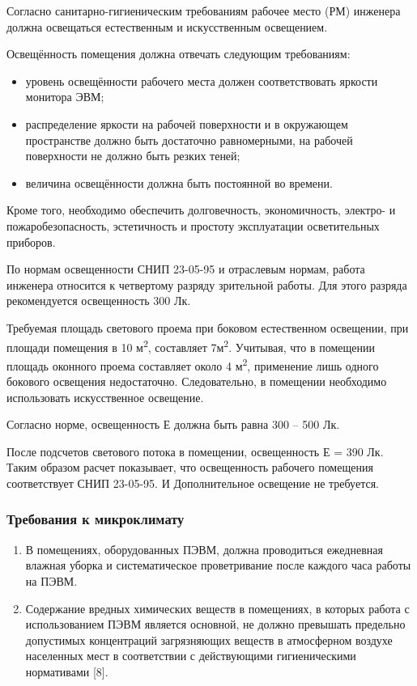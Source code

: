 Согласно санитарно-гигиеническим требованиям рабочее место (РМ) инженера должна освещаться естественным и искусственным освещением.

Освещённость помещения должна отвечать следующим требованиям:

\begin{itemize}
 \item уровень освещённости рабочего места должен соответствовать яркости монитора ЭВМ;
 \item распределение яркости на рабочей поверхности и в окружающем пространстве должно быть достаточно равномерными, на рабочей поверхности не должно быть резких теней;
 \item величина освещённости должна быть постоянной во времени.
\end{itemize}

Кроме того, необходимо обеспечить долговечность, экономичность, электро- и пожаробезопасность, эстетичность и простоту эксплуатации осветительных приборов.

По нормам освещенности СНИП 23-05-95 и отраслевым нормам, работа инженера относится к четвертому разряду зрительной работы. Для этого разряда рекомендуется освещенность 300 Лк. 

Требуемая площадь светового проема при боковом естественном освещении, при площади помещения в 10 м\textsuperscript{2}, составляет 7м\textsuperscript{2}. Учитывая, что в помещении площадь оконного проема составляет около 4 м\textsuperscript{2}, применение лишь одного бокового освещения недостаточно. Следовательно, в помещении необходимо использовать искусственное освещение. 

Согласно норме, освещенность Е должна быть равна 300 – 500 Лк. 

После подсчетов светового потока в помещении, освещенность Е = 390 Лк. Таким образом расчет показывает, что освещенность рабочего помещения соответствует СНИП 23-05-95. И Дополнительное освещение не требуется.

\subsubsection{Требования к микроклимату}

\begin{enumerate}
 \item В помещениях, оборудованных ПЭВМ, должна проводиться ежедневная влажная уборка и систематическое проветривание после каждого часа работы на ПЭВМ.
 \item Содержание вредных химических веществ в помещениях, в которых работа с использованием ПЭВМ является основной, не должно превышать предельно допустимых концентраций загрязняющих веществ в атмосферном воздухе населенных мест в соответствии с действующими гигиеническими нормативами [8].
\end{enumerate}

